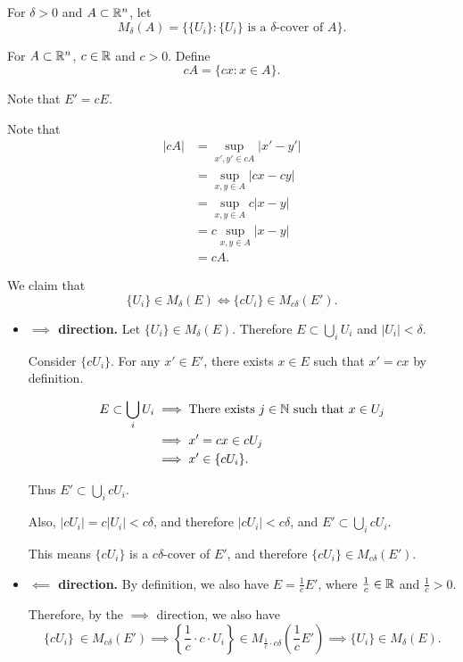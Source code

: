 For \(\delta > 0\) and \(A \subset \mathbb{R}^n\), let
\[
M_\delta(A) = \{\{U_i\} : \{U_i\} \text{ is a \(\delta\)-cover of } A\}.
\]

For \(A \subset \mathbb{R}^n\), \(c \in \mathbb{R}\) and \(c > 0\). Define
\[
c A = \{cx : x \in A\}.
\]

Note that \(E' = cE\).

Note that
\begin{align*}
    |cA| &= \sup_{x', y' \in cA} |x' - y'|\\
    &= \sup_{x, y \in A} |cx - cy|\\
    &= \sup_{x, y \in A} c|x - y|\\
    &= c \sup_{x, y \in A} |x - y|\\
    &= cA.
\end{align*}

We claim that
\[\{U_i\} \in M_{\delta}(E) \iff \{c U_i\}\in M_{c\delta}(E').\]

\begin{itemize}
    \item \textbf{\(\implies\) direction.} Let \(\{U_i\} \in M_\delta(E)\). Therefore \(E \subset \bigcup_i U_i\) and \(|U_i| < \delta\).

    Consider \( \{c U_i\}\). For any \(x' \in E'\), there exists \(x \in E\) such that \(x' = cx\) by definition.

    \begin{align*}
        E \subset \bigcup_i U_i &\implies \text{There exists } j \in \mathbb{N} \text{ such that } x \in U_j\\
        &\implies x' = cx \in c U_j\\
        &\implies x' \in \{c U_i\}.
    \end{align*}

    Thus \(E' \subset \bigcup_i c U_i\).

    Also, \(|cU_i| = c|U_i| < c\delta\), and therefore \(|c U_i| < c\delta\), and \(E' \subset \bigcup_{i} c U_i\).

    This means \(\{c U_i\}\)  is a \(c\delta\)-cover of \(E'\), and therefore \( \{cU_i\} \in M_{c\delta}(E')\).

    \item \textbf{\(\impliedby\) direction.} By definition, we also have \(E = \frac{1}{c} E'\), where \(\frac{1}{c} \in \mathbb{R}\) and \(\frac{1}{c} > 0\).

    Therefore, by the \(\implies\) direction, we also have
    \[
        \{c U_i\}\ \in M_{c\delta} (E') \implies \left\{\frac{1}{c} \cdot c \cdot U_i\right\} \in M_{\frac{1}{c}\cdot c\delta}\left(\frac{1}{c}E'\right) \implies \{U_i\} \in M_\delta (E).
    \]
\end{itemize}

